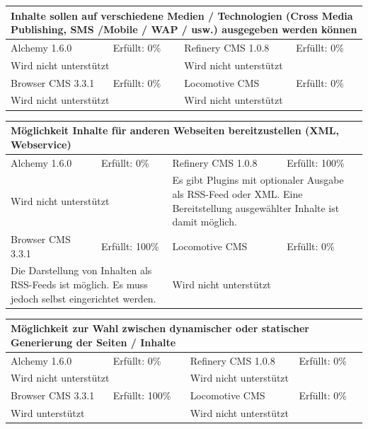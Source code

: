 \begin{tabular}[!ht]{|l|l|l|l|}
\hline
\multicolumn{4}{|p{15cm}|}{\textbf{Inhalte sollen auf verschiedene Medien / Technologien (Cross Media Publishing, SMS /Mobile / WAP / usw.) ausgegeben werden können}} \\
\hline
  Alchemy 1.6.0 & \cellcolor{red}Erfüllt: 0\% & Refinery CMS 1.0.8 & \cellcolor{red}Erfüllt: 0\% \\
  \hline
  \multicolumn{2}{|p{7.5cm}|}{Wird nicht unterstützt} & \multicolumn{2}{p{7.5cm}|}{Wird nicht unterstützt} \\
  \hline
  Browser CMS 3.3.1 & \cellcolor{red}Erfüllt: 0\% & Locomotive CMS & \cellcolor{red}Erfüllt: 0\% \\
  \hline
  \multicolumn{2}{|p{7.5cm}|}{Wird nicht unterstützt} & \multicolumn{2}{p{7.5cm}|}{Wird nicht unterstützt} \\
\hline
\end{tabular}
\newline
\newline
\newline
\begin{tabular}[!ht]{|l|l|l|l|}
\hline
\multicolumn{4}{|p{15cm}|}{\textbf{Möglichkeit Inhalte für anderen Webseiten bereitzustellen (XML, Webservice)}} \\
\hline
  Alchemy 1.6.0 & \cellcolor{red}Erfüllt: 0\% & Refinery CMS 1.0.8 & \cellcolor{green}Erfüllt: 100\% \\
  \hline
  \multicolumn{2}{|p{7.5cm}|}{Wird nicht unterstützt} & \multicolumn{2}{p{7.5cm}|}{Es gibt Plugins mit optionaler Ausgabe als RSS-Feed oder XML. Eine Bereitstellung ausgewählter Inhalte ist damit möglich.} \\
  \hline
  Browser CMS 3.3.1 & \cellcolor{green}Erfüllt: 100\% & Locomotive CMS & \cellcolor{red}Erfüllt: 0\% \\
  \hline
  \multicolumn{2}{|p{7.5cm}|}{Die Darstellung von Inhalten als RSS-Feeds ist möglich. Es muss jedoch selbst eingerichtet werden.} & \multicolumn{2}{p{7.5cm}|}{Wird nicht unterstützt} \\
\hline
\end{tabular}
\newline
\newline
\newline
\begin{tabular}[!ht]{|l|l|l|l|}
\hline
\multicolumn{4}{|p{15cm}|}{\textbf{Möglichkeit zur Wahl zwischen dynamischer oder statischer Generierung der Seiten / Inhalte}} \\
\hline
  Alchemy 1.6.0 & \cellcolor{red}Erfüllt: 0\% & Refinery CMS 1.0.8 & \cellcolor{red}Erfüllt: 0\% \\
  \hline
  \multicolumn{2}{|p{7.5cm}|}{Wird nicht unterstützt} & \multicolumn{2}{p{7.5cm}|}{Wird nicht unterstützt} \\
  \hline
  Browser CMS 3.3.1 & \cellcolor{green}Erfüllt: 100\% & Locomotive CMS & \cellcolor{red}Erfüllt: 0\% \\
  \hline
  \multicolumn{2}{|p{7.5cm}|}{Wird unterstützt} & \multicolumn{2}{p{7.5cm}|}{Wird nicht unterstützt} \\
\hline
\end{tabular}
